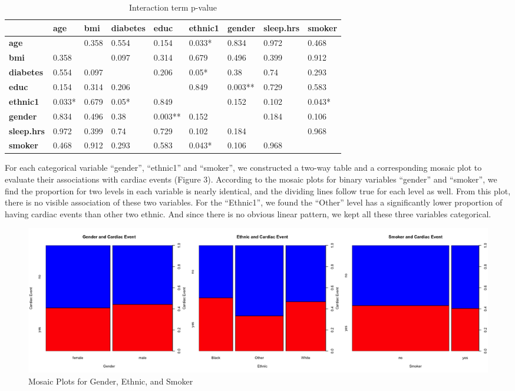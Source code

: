 \documentclass[12pt]{article}
\begin{document}
\begin{table}[!ht]
    \centering
    \small
    \caption{Interaction term p-value }
    \begin{tabular}{lllllllll}
    \hline
    \hline
        \textbf{} & \textbf{age} & \textbf{bmi} & \textbf{diabetes} & \textbf{educ} & \textbf{ethnic1} & \textbf{gender} & \textbf{sleep.hrs} & \textbf{smoker } \\ \hline
        \textbf{age} & ~ & 0.358 & 0.554 & 0.154 & 0.033* & 0.834 & 0.972 & 0.468  \\ \hline
        \textbf{bmi} & 0.358 & ~ & 0.097 & 0.314 & 0.679 & 0.496 & 0.399 & 0.912  \\ \hline
        \textbf{diabetes} & 0.554 & 0.097 & ~ & 0.206 & 0.05* & 0.38 & 0.74 & 0.293  \\ \hline
        \textbf{educ} & 0.154 & 0.314 & 0.206 & ~ & 0.849 & 0.003** & 0.729 & 0.583  \\ \hline
        \textbf{ethnic1} & 0.033* & 0.679 & 0.05* & 0.849 & ~ & 0.152 & 0.102 & 0.043*  \\ \hline
        \textbf{gender} & 0.834 & 0.496 & 0.38 & 0.003** & 0.152 & ~ & 0.184 & 0.106  \\ \hline
        \textbf{sleep.hrs} & 0.972 & 0.399 & 0.74 & 0.729 & 0.102 & 0.184 & ~ & 0.968  \\ \hline
        \textbf{smoker} & 0.468 & 0.912 & 0.293 & 0.583 & 0.043* & 0.106 & 0.968 &   \\ \hline
        \hline
    \end{tabular}
\end{table}

\newpage
For each categorical variable “gender”, “ethnic1” and “smoker”, we constructed a two-way table and a corresponding mosaic plot to evaluate their associations with cardiac events (Figure 3). According to the mosaic plots for binary variables “gender” and “smoker”, we find the proportion for two levels in each variable is nearly identical, and the dividing lines follow true for each level as well. From this plot, there is no visible association of these two variables. For the “Ethnic1”, we found the “Other” level has a significantly lower proportion of having cardiac events than other two ethnic. And since there is no obvious linear pattern, we kept all these three variables categorical.

\begin{figure}[!ht]
 \includegraphics[width=\textwidth]{Img/moscia plot for categorical.png}
 \caption{Mosaic Plots for Gender, Ethnic, and Smoker}
\end{figure}
\end{document}
